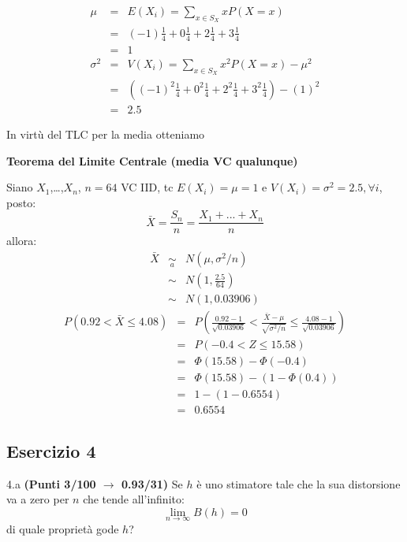 \documentclass[
  11pt,
]{book}
\theoremstyle{mytheoremstyle}
\theoremstyle{mydefstyle}
\newenvironment{sol}
  {
  \begin{tcolorbox}[enhanced,breakable,arc=0.1mm,boxrule=1pt,colback=white,colframe=iblue,
  title=\bf \fontfamily{lmss}\selectfont \hspace{.5 cm} Soluzione,drop fuzzy shadow]

}{
\end{tcolorbox}
  }
\begin{document}
\begin{sol}
\begin{eqnarray*} \mu &=& E(X_i) = \sum_{x\in S_X}x P(X=x)\\ 
 &=& ( -1 ) \frac { 1 }{ 4 }+ 0  \frac { 1 }{ 4 }+ 2  \frac { 1 }{ 4 }+ 3  \frac { 1 }{ 4 } \\ 
            &=& 1 \\ 
 \sigma^2 &=& V(X_i) = \sum_{x\in S_X}x^2 P(X=x)-\mu^2\\ 
 &=&\left( ( -1 ) ^2\frac { 1 }{ 4 }+ 0  ^2\frac { 1 }{ 4 }+ 2  ^2\frac { 1 }{ 4 }+ 3  ^2\frac { 1 }{ 4 } \right)-( 1 )^2\\ 
            &=& 2.5 
\end{eqnarray*}

In virtù del TLC per la media otteniamo

\textbf{Teorema del Limite Centrale (media VC qualunque)}

Siano \(X_1\),\ldots,\(X_n\), \(n=64\) VC IID, tc \(E(X_i)=\mu=1\) e \(V(X_i)=\sigma^2=2.5,\forall i\), posto:
\[
      \bar X=\frac{S_n}n =\frac{X_1 + ... + X_n}n
      \]
allora:\begin{eqnarray*}
  \bar X & \mathop{\sim}\limits_{a}& N(\mu,\sigma^2/n) \\
     &\sim & N\left(1,\frac{2.5}{64}\right) \\
     &\sim & N(1,0.03906)
  \end{eqnarray*}\begin{eqnarray*}
   P( 0.92 < \bar X \leq  4.08 ) &=& P\left( \frac { 0.92  -  1 }{\sqrt{ 0.03906 }} < \frac { \bar X  -  \mu }{ \sqrt{\sigma^2/n} } \leq \frac { 4.08  -  1 }{\sqrt{ 0.03906 }}\right)  \\
              &=& P\left(  -0.4  < Z \leq  15.58 \right) \\
              &=& \Phi( 15.58 )-\Phi( -0.4 )\\
              &=&  \Phi( 15.58 )-(1-\Phi( 0.4 )) \\ &=&  1 -(1- 0.6554 ) \\ 
              &=&  0.6554 
   \end{eqnarray*}

\end{sol}

\subsection{Esercizio 4}\label{esercizio-4-6}

4.a \textbf{(Punti 3/100 \(\rightarrow\) 0.93/31)} Se \(h\) è uno stimatore tale che la sua distorsione va a zero per \(n\) che tende all'infinito:
\[
\lim_{n\to \infty}B(h)=0
\]
di quale proprietà gode \(h\)?
\end{document}
